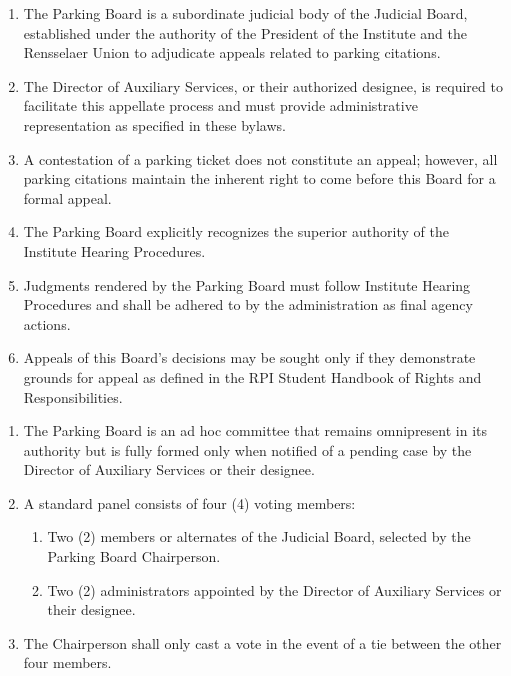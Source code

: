 
\begin{enumerate}
    \item The Parking Board is a subordinate judicial body of the Judicial Board, established under the authority of the President of the Institute and the Rensselaer Union to adjudicate appeals related to parking citations.
    \item The Director of Auxiliary Services, or their authorized designee, is required to facilitate this appellate process and must provide administrative representation as specified in these bylaws.
    \item A contestation of a parking ticket does not constitute an appeal; however, all parking citations maintain the inherent right to come before this Board for a formal appeal.
    \item The Parking Board explicitly recognizes the superior authority of the Institute Hearing Procedures.
    \item Judgments rendered by the Parking Board must follow Institute Hearing Procedures and shall be adhered to by the administration as final agency actions.
    \item Appeals of this Board's decisions may be sought only if they demonstrate grounds for appeal as defined in the RPI Student Handbook of Rights and Responsibilities.
\end{enumerate}

\begin{enumerate}
    \item The Parking Board is an ad hoc committee that remains omnipresent in its authority but is fully formed only when notified of a pending case by the Director of Auxiliary Services or their designee.
    \item A standard panel consists of four (4) voting members:
    \begin{enumerate}
        \item Two (2) members or alternates of the Judicial Board, selected by the Parking Board Chairperson.
        \item Two (2) administrators appointed by the Director of Auxiliary Services or their designee.
    \end{enumerate}
    \item The Chairperson shall only cast a vote in the event of a tie between the other four members.
\end{enumerate}

